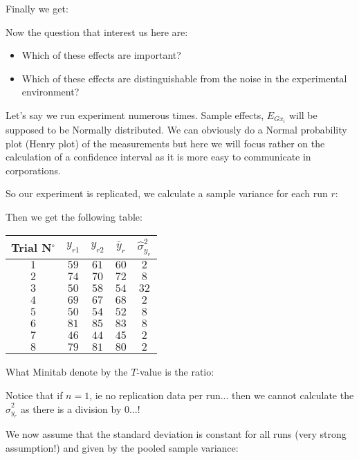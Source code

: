 	Finally we get:
	
	Now the question that interest us here are:
	\begin{itemize}
		\item Which of these effects are important?
		\item Which of these effects are distinguishable from the noise in the experimental environment?
	\end{itemize}
	Let's say we run experiment numerous times. Sample effects, $E_{Gx_i}$ will be supposed to be Normally distributed. We can obviously do a Normal probability plot (Henry plot) of the measurements but here we will focus rather on the calculation of a confidence interval as it is more easy to communicate in corporations.

	So our experiment is replicated, we calculate a sample variance for each run $r$:
	
	Then we get the following table:
	\begin{table}[H]\centering
	\begin{center}
			\begin{tabular}{|c|c|c|c|c|}
				\hline
				\multicolumn{1}{c}{\cellcolor{black!30}\textbf{Trial N${}^\circ$}} & 
  \multicolumn{1}{c}{\cellcolor{black!30}$y_{r1}$} & 
  \multicolumn{1}{c}{\cellcolor{black!30}$y_{r2}$} & 
  \multicolumn{1}{c}{\cellcolor{black!30}$\bar{y}_r$} & 
  \multicolumn{1}{c}{\cellcolor{black!30}$\hat{\sigma}_{y_r}^2$} \\ \hline
				 $1$ & $59$ & $61$ & $60$ & $2$\\ \hline
				 $2$ & $74$ & $70$ & $72$ & $8$\\ \hline
				 $3$ & $50$ & $58$ & $54$ & $32$\\ \hline
				 $4$ & $69$ & $67$ & $68$ & $2$\\ \hline
				 $5$ & $50$ & $54$ & $52$ & $8$\\ \hline
				 $6$ & $81$ & $85$ & $83$ & $8$\\ \hline
				 $7$ & $46$ & $44$ & $45$ & $2$\\ \hline
				 $8$ & $79$ & $81$ & $80$ & $2$\\ \hline
		\end{tabular}
	\end{center}
	\end{table}	
	\begin{tcolorbox}[title=Remark,colframe=black,arc=10pt]
	What Minitab denote by the $T$-value is the ratio:
	
	Notice that if $n=1$, ie no replication data per run... then we cannot calculate the $\hat{\sigma}_{y_r}^2$ as there is a division by $0$...!
	\end{tcolorbox}
	We now assume that the standard deviation is constant for all runs (very strong assumption!) and given by the pooled sample variance:
	
